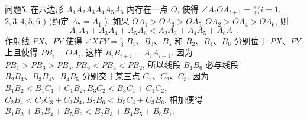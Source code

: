 问题5. 在六边形 $A_1 A_2 A_3 A_4 A_5 A_6$ 内存在一点 $O$, 使得 $\angle A_i O A_{i+1}=\frac{\pi}{3} ( i=1$, $2,3,4,5,6$ ) (约定 $A_7=A_1$ ). 如果 $O A_1>O A_3>O A_5, O A_2>O A_4> O A_6$, 则
$$
A_1 A_2+A_3 A_4+A_5 A_6<A_2 A_3+A_4 A_5+A_6 A_1 .
$$
作射线 $P X 、 P Y$ 使得 $\angle X P Y=\frac{\pi}{3} . B_1 、 B_3 、 B_5$ 和 $B_2 、 B_4 、 B_6$ 分别位于 $P X 、 P Y$ 上且使得 $P B_i=O A_i$, 这样 $B_i B_{i+1}=A_i A_{i+1}$. 因为 $P B_1>P B_3> P B_5, P B_6<P B_4<P B_2$, 所以线段 $B_1 B_6$ 必与线段 $B_2 B_3 、 B_3 B_4 、 B_4 B_5$ 分别交于某三点 $C_1 、 C_2 、 C_3$. 因为 $B_1 B_2<B_1 C_1+C_1 B_2, B_3 C_2<B_3 C_1+C_1 C_2$, $C_2 B_4<C_2 C_3+C_3 B_4, B_5 B_6<B_5 C_3+C_3 B_6$, 相加便得 $B_1 B_2+B_3 B_4+B_5 B_6< B_2 B_3+B_4 B_5+B_6 B_1$.



